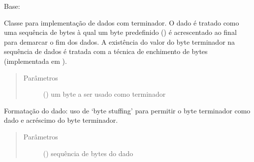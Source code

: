 \documentclass[letterpaper,10pt,brazil]{sphinxmanual}
\begin{document}
\begin{fulllineitems}
\label{\detokenize{estrutarq.dado:estrutarq.dado.DadoTerminador}}
\pysigstartsignatures
{}
\pysigstopsignatures
\sphinxAtStartPar
Base: {\hyperref[\detokenize{estrutarq.dado:estrutarq.dado.DadoBasico}]{}}

\sphinxAtStartPar
Classe para implementação de dados com terminador. O dado é tratado como
uma sequência de bytes à qual um byte predefinido
({\hyperref[\detokenize{estrutarq.dado:estrutarq.dado.DadoTerminador.terminador}]{}}) é
acrescentado ao final para demarcar o fim dos dados. A existência do
valor do byte terminador na sequência de dados é tratada com a técnica
de enchimento de bytes (implementada em
{\hyperref[\detokenize{estrutarq.dado:estrutarq.dado.DadoBasico}]{}}).
\begin{quote}\begin{description}
\item[{Parâmetros}] \leavevmode
\sphinxAtStartPar
{} () \textendash{} um byte a ser usado como terminador

\end{description}\end{quote}

\begin{fulllineitems}
\label{\detokenize{estrutarq.dado:estrutarq.dado.DadoTerminador.adicione_formatacao}}
\pysigstartsignatures
{}
\pysigstopsignatures
\sphinxAtStartPar
Formatação do dado: uso de ‘byte stuffing’ para permitir o byte
terminador como dado e acréscimo do byte terminador.
\begin{quote}\begin{description}
\item[{Parâmetros}] \leavevmode
\sphinxAtStartPar
{} () \textendash{} sequência de bytes do dado


\end{description}
\end{quote}
\end{fulllineitems}
\end{fulllineitems}
\end{document}
